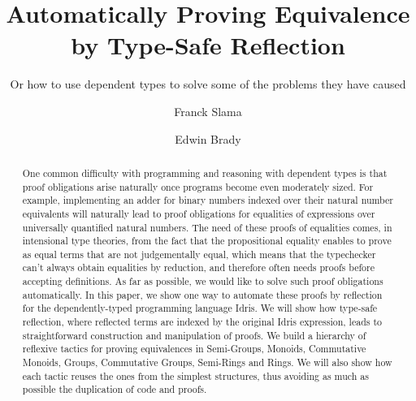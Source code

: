 \documentclass{llncs}
\begin{document}
%
\pagestyle{headings}  %

\mainmatter              %
%
\title{Automatically Proving Equivalence by Type-Safe Reflection}
\subtitle{Or how to use dependent types to solve some of the problems they have caused}
%
%
\author{Franck Slama \and Edwin Brady}

\maketitle              %

\begin{abstract}
One common difficulty with programming and reasoning with dependent types is that proof obligations arise naturally once programs become even moderately sized. For example, implementing an adder for binary numbers indexed over their natural number equivalents will naturally lead to proof obligations for equalities of expressions over universally quantified natural numbers. The need of these proofs of equalities comes, in intensional type theories, from the fact that the propositional equality enables to prove as equal terms that are not judgementally equal, which means that the typechecker can't always obtain equalities by reduction, and therefore often needs proofs before accepting definitions.
As far as possible, we would like to solve such proof obligations automatically. In this paper, we show one way to automate these proofs by reflection for the dependently-typed programming language Idris. We will show how type-safe reflection, where reflected terms are indexed by the original Idris expression, leads to straightforward construction and manipulation of proofs. We build a hierarchy of reflexive tactics for proving equivalences in Semi-Groups, Monoids, Commutative Monoids, Groups, Commutative Groups, Semi-Rings and Rings. We will also show how each tactic reuses the ones from the simplest structures, thus avoiding as much as possible the duplication of code and proofs.
\end{abstract}
%












\end{document}
